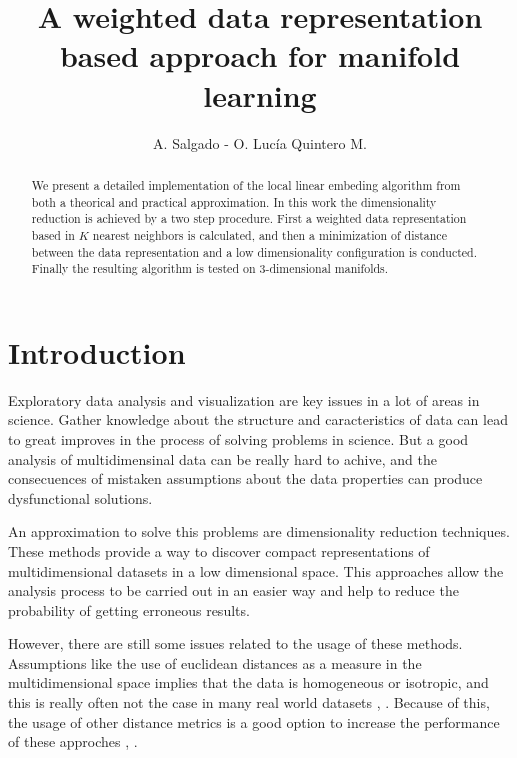 \documentclass[12pt,journal]{IEEEtran}
\begin{document}
\title{A weighted data representation based approach for manifold learning}
\author{A. Salgado - O. Lucía Quintero M.}
\maketitle

\begin{abstract}
    We present a detailed implementation of the local linear embeding
    algorithm from both a theorical and practical approximation. In this work the
    dimensionality reduction is achieved by a two step procedure. First a
    weighted data representation based in $K$ nearest neighbors is calculated, and
    then a minimization of distance between the data representation and a low
    dimensionality configuration is conducted. Finally the resulting algorithm
    is tested on 3-dimensional manifolds.
\end{abstract}

\section{Introduction}


Exploratory data analysis and visualization are key issues in a lot of areas
in science. Gather knowledge about the structure and caracteristics of data
can lead to great improves in the process of solving problems in science. But a
good analysis of multidimensinal data can be really hard to achive, and the
consecuences of mistaken assumptions about the data properties can produce
dysfunctional solutions.

\vspace{0.25cm}

An approximation to solve this problems are dimensionality reduction techniques.
These methods provide a way to discover compact representations of
multidimensional datasets in a low dimensional space. This approaches allow the
analysis process to be carried out in an easier way and help to reduce the
probability of getting erroneous results.

\vspace{0.25cm}

However, there are still some issues related to the usage of these methods.
Assumptions like the use of euclidean distances as a measure in the
multidimensional space implies that the data is homogeneous or isotropic, and
this is really often not the case in many real world datasets
\cite{homogeneous1}, \cite{homogeneous2}. Because of this, the usage of other
distance metrics is a good option to increase the performance of these approches
\cite{dist1}, \cite{dist2}.
\end{document}
